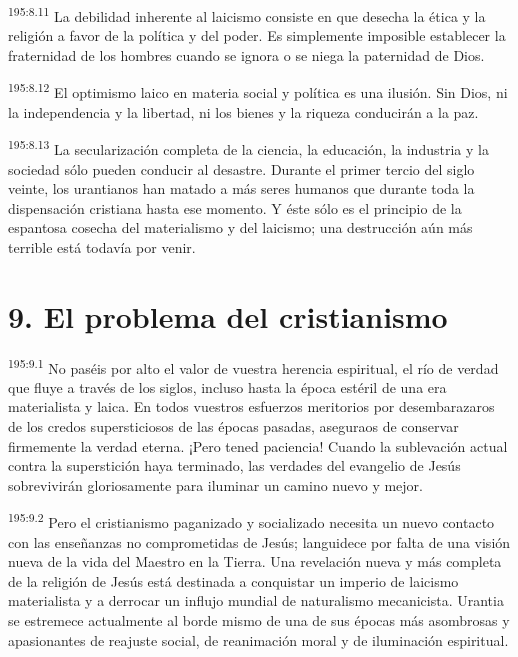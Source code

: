 \par 
\textsuperscript{195:8.11} La debilidad inherente al laicismo consiste en que desecha la ética y la religión a favor de la política y del poder. Es simplemente imposible establecer la fraternidad de los hombres cuando se ignora o se niega la paternidad de Dios.

\par 
\textsuperscript{195:8.12} El optimismo laico en materia social y política es una ilusión. Sin Dios, ni la independencia y la libertad, ni los bienes y la riqueza conducirán a la paz.

\par 
\textsuperscript{195:8.13} La secularización completa de la ciencia, la educación, la industria y la sociedad sólo pueden conducir al desastre. Durante el primer tercio del siglo veinte, los urantianos han matado a más seres humanos que durante toda la dispensación cristiana hasta ese momento. Y éste sólo es el principio de la espantosa cosecha del materialismo y del laicismo; una destrucción aún más terrible está todavía por venir.

\section*{9. El problema del cristianismo}
\par 
\textsuperscript{195:9.1} No paséis por alto el valor de vuestra herencia espiritual, el río de verdad que fluye a través de los siglos, incluso hasta la época estéril de una era materialista y laica. En todos vuestros esfuerzos meritorios por desembarazaros de los credos supersticiosos de las épocas pasadas, aseguraos de conservar firmemente la verdad eterna. ¡Pero tened paciencia! Cuando la sublevación actual contra la superstición haya terminado, las verdades del evangelio de Jesús sobrevivirán gloriosamente para iluminar un camino nuevo y mejor.

\par 
\textsuperscript{195:9.2} Pero el cristianismo paganizado y socializado necesita un nuevo contacto con las enseñanzas no comprometidas de Jesús; languidece por falta de una visión nueva de la vida del Maestro en la Tierra. Una revelación nueva y más completa de la religión de Jesús está destinada a conquistar un imperio de laicismo materialista y a derrocar un influjo mundial de naturalismo mecanicista. Urantia se estremece actualmente al borde mismo de una de sus épocas más asombrosas y apasionantes de reajuste social, de reanimación moral y de iluminación espiritual.

